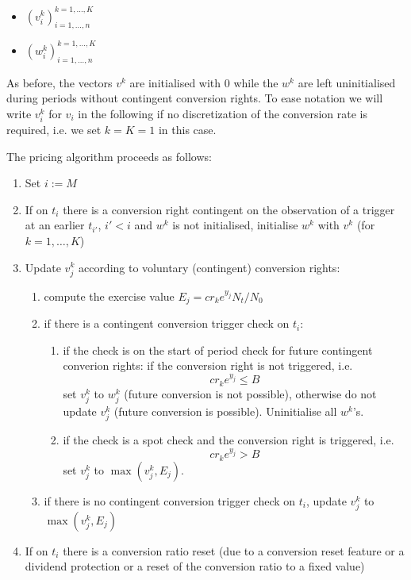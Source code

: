 {\begin{itemize}
\item $(v_i^k)_{i=1,\ldots,n}^{k=1,\ldots,K}$
\item $(w_i^k)_{i=1,\ldots,n}^{k=1,\ldots,K}$
\end{itemize}

As before, the vectors $v^k$ are initialised with $0$ while the $w^k$ are left uninitialised during periods without
contingent conversion rights. To ease notation we will write $v^k_i$ for $v_i$ in the following if no discretization of
the conversion rate is required, i.e. we set $k=K=1$ in this case.

The pricing algorithm proceeds as follows:

\begin{enumerate}
\item Set $i := M$
\item \label{algo:convertible_rollback_1} If on $t_i$ there is a conversion right contingent on the observation of a
  trigger at an earlier $t_{i'}$, $i'<i$ and $w^k$ is not initialised, initialise $w^k$ with $v^k$ (for $k=1,\ldots,K$)
\item Update $v_j^k$ according to voluntary (contingent) conversion rights:
  \begin{enumerate}
  \item compute the exercise value $E_j = cr_k e^{y_j} N_t / N_0$
  \item if there is a contingent conversion trigger check on $t_i$:
    \begin{enumerate}
    \item if the check is on the start of period check for future contingent converion rights: if the conversion right
      is not triggered, i.e.
      $$cr_k e^{y_j} \leq B$$
      set $v_j^k$ to $w_j^k$ (future conversion is not possible), otherwise do not update $v_j^k$ (future conversion is
      possible). Uninitialise all $w^k$'s.
    \item if the check is a spot check and the conversion right is triggered, i.e.
      $$cr_k e^{y_j} > B$$
      set $v_j^k$ to $\max(v_j^k, E_j)$.
    \end{enumerate}
  \item if there is no contingent conversion trigger check on $t_i$, update $v_j^k$ to $\max(v_j^k, E_j)$
  \end{enumerate}
\item If on $t_i$ there is a conversion ratio reset (due to a conversion reset feature or a dividend protection or a
  reset of the conversion ratio to a fixed value)

\end{enumerate}}

